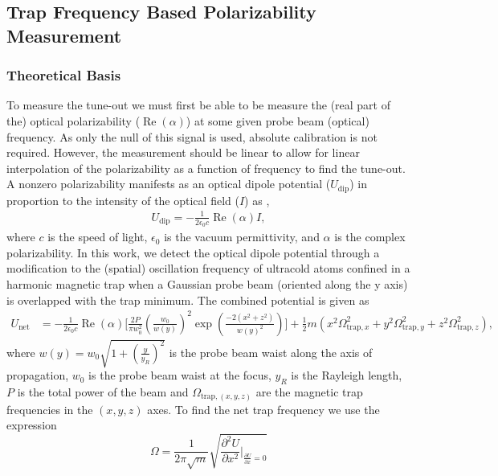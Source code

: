 \documentclass[%
 amsmath,amssymb,
aps,
]{revtex4-2}
\begin{document}
\subsection{Trap Frequency Based Polarizability Measurement}
\label{sec:trap_freq_measure}
\subsubsection{Theoretical Basis}
To measure the tune-out we must first be able to be measure the (real part of the) optical polarizability (\(\operatorname{Re}(\alpha)\)) at some given probe beam (optical) frequency. As only the null of this signal is used, absolute calibration is not required. However, the measurement should be linear to allow for linear interpolation of the polarizability as a function of frequency to find the tune-out.  A nonzero polarizability manifests as an optical dipole potential (\(U_{\mathrm{dip}}\)) in proportion to the intensity of the optical field (\(I\)) as \cite{grimm1999optical},
 \begin{align}
    U_{\mathrm{dip}}=-\frac{1}{2 \epsilon_{0} c} \operatorname{Re}(\alpha) I ,
\end{align}
where \(c\) is the speed of light, \(\epsilon_{0}\) is the vacuum permittivity, and \(\alpha\) is the complex polarizability. In this work, we detect the optical dipole potential through a modification to the (spatial) oscillation frequency of ultracold atoms confined in a harmonic magnetic trap when a Gaussian probe beam (oriented along the y axis) is overlapped with the trap minimum. The combined potential is given as
 \begin{align}
    U_{\mathrm{net}}& =-\frac{1}{2 \epsilon_{0} c} \operatorname{Re}(\alpha) 
    \bigg[ 
        \frac{2 P}{\pi w_0^2} \left(\frac{w_0}{w(y)}\right)^2 \exp\left( \frac{-2 (x^2+z^2)}{w(y)^2} \right)
    \bigg]
    + \frac{1}{2} m (x^2 \Omega_{\text{trap},x}^2  +y^2 \Omega_{\text{trap},y}^2  +z^2 \Omega_{\text{trap},z}^2 ), \label{eqn:net_U}
 \end{align}
where \(w(y) = w_0 \sqrt{1+\left( \frac{y}{y_R} \right)^2 }\) is the probe beam waist along the axis of propagation, \(w_0\) is the probe beam waist at the focus, \(y_R\) is the Rayleigh length, \(P\) is the total power of the beam and \( \Omega_{\text{trap},(x,y,z)} \) are the magnetic trap frequencies in the \((x,y,z)\) axes.
To find the net trap frequency we use the expression   
\begin{equation}
\Omega=\frac{1}{2\pi\sqrt{m}} \sqrt{\frac{\partial^{2} U}{\partial x^{2}} \biggr\rvert_{\frac{\partial U}{\partial x}=0}}
\label{eq:omega_from_u}
\end{equation}
\end{document}
